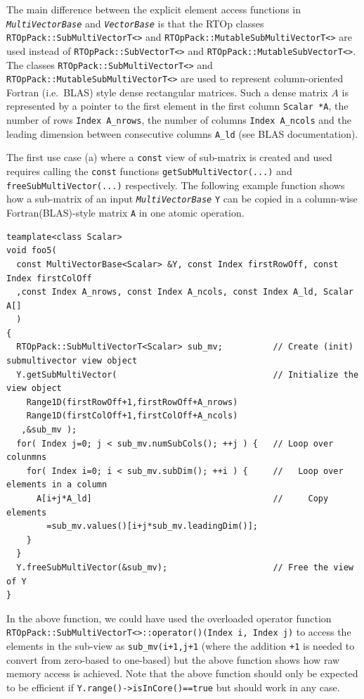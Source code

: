 \documentclass[pdf,ps2pdf,11pt]{SANDreport}
\begin{document}
The main difference between the explicit element access functions in
{}\texttt{\textit{Multi\-Vector\-Base}} and {}\texttt{\textit{Vector\-Base}} is
that the RTOp classes {}\texttt{RTOpPack::\-Sub\-Multi\-Vector\-T<>}
and {}\texttt{RTOpPack::\-Mutable\-Sub\-Multi\-Vector\-T<>} are used
instead of {}\texttt{RTOpPack::\-Sub\-Vector\-T<>} and
{}\texttt{RTOpPack::\-Mutable\-Sub\-Vector\-T<>}.  The classes
{}\texttt{RTOpPack::\-Sub\-Multi\-Vector\-T<>} and
{}\texttt{RTOpPack::\-Mutable\-Sub\-Multi\-Vector\-T<>} are used to
represent column-oriented Fortran (i.e.~BLAS) style dense rectangular
matrices.  Such a dense matrix $A$ is represented by a pointer to the
first element in the first column {}\texttt{Scalar *A}, the number of
rows {}\texttt{Index A\_nrows}, the number of columns {}\texttt{Index
A\_ncols} and the leading dimension between consecutive columns
{}\texttt{A\_ld} (see BLAS documentation).

The first use case (a) where a {}\texttt{const} view of sub-matrix is
created and used requires calling the {}\texttt{const} functions
{}\texttt{get\-Sub\-Multi\-Vector(...)} and
{}\texttt{free\-Sub\-Multi\-Vector(...)}  respectively.  The following
example function shows how a sub-matrix of an input
{}\texttt{\textit{Multi\-Vector\-Base}} {}\texttt{Y} can be copied in a
column-wise Fortran(BLAS)-style matrix {}\texttt{A} in one atomic
operation.

{\scriptsize\begin{verbatim}
teamplate<class Scalar>
void foo5(
  const MultiVectorBase<Scalar> &Y, const Index firstRowOff, const Index firstColOff
  ,const Index A_nrows, const Index A_ncols, const Index A_ld, Scalar A[]
  )
{
  RTOpPack::SubMultiVectorT<Scalar> sub_mv;          // Create (init) submultivector view object
  Y.getSubMultiVector(                               // Initialize the view object
    Range1D(firstRowOff+1,firstRowOff+A_nrows)
    Range1D(firstColOff+1,firstColOff+A_ncols)
   ,&sub_mv );
  for( Index j=0; j < sub_mv.numSubCols(); ++j ) {   // Loop over colunmns
    for( Index i=0; i < sub_mv.subDim(); ++i ) {     //   Loop over elements in a column
      A[i+j*A_ld]                                    //     Copy elements
        =sub_mv.values()[i+j*sub_mv.leadingDim()];
    }
  }
  Y.freeSubMultiVector(&sub_mv);                     // Free the view of Y
}
\end{verbatim}}

In the above function, we could have used the overloaded operator
function
{}\texttt{RTOpPack::\-Sub\-Multi\-VectorT<>::\-operator()(Index i,
Index j)} to access the elements in the sub-view as
{}\texttt{sub\_mv(i+1,j+1} (where the addition {}\texttt{+1} is needed
to convert from zero-based to one-based) but the above function shows
how raw memory access is achieved.  Note that the above function
should only be expected to be efficient if
{}\texttt{Y.range()->isInCore()==true} but should work in any case.
\end{document}

